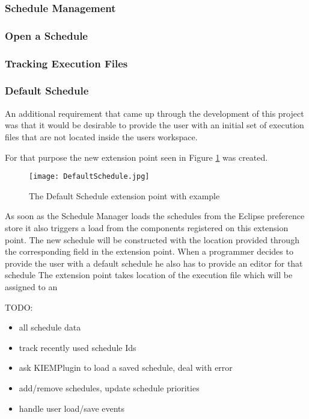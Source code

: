 \subsubsection{Schedule Management}
\label{section:ScheduleManagement}

\subsubsection{Open a Schedule}
\label{section:OpenSchedule}

\subsubsection{Tracking Execution Files}
\label{section:TrackingExecutionFiles}

\subsubsection{Default Schedule}
\label{section:DefaultSchedule}
An additional requirement that came up through the development of this project was that it would
be desirable to provide the user with an initial set of execution files that are not located inside
the users workspace.

For that purpose the new extension point seen in Figure \ref{fig:DefaultSchedule} was created.
\begin{figure}[Default Schedule]
  \centering
  \texttt{[image: DefaultSchedule.jpg]}
  \caption[The Default Schedule extension point]%
  {The Default Schedule extension point with example\protect}
  \label{fig:DefaultSchedule}
\end{figure}

As soon as the Schedule Manager loads the schedules from the Eclipse preference store it also triggers
a load from the components registered on this extension point. The new schedule will be constructed with
the location provided through the corresponding field in the extension point. When a programmer decides
to provide the user with a default schedule he also has to provide an editor for that schedule
The extension point takes location of the execution file which will be assigned to an 

TODO:
\begin{itemize}
 \item all schedule data
 \item track recently used schedule Ids
 \item ask KIEMPlugin to load a saved schedule, deal with error
 \item add/remove schedules, update schedule priorities
 \item handle user load/save events
\end{itemize}


